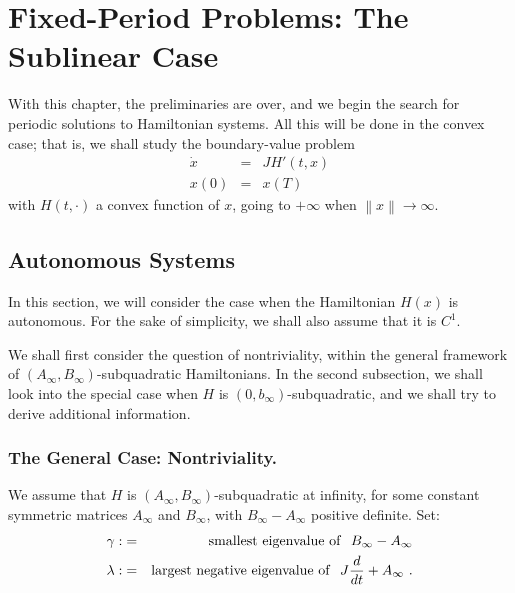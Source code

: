 \documentclass{svproc}
\begin{document}
    


\section{Fixed-Period Problems: The Sublinear Case}
%
With this chapter, the preliminaries are over, and we begin the search
for periodic solutions to Hamiltonian systems. All this will be done in
the convex case; that is, we shall study the boundary-value problem
\begin{eqnarray*}
  \dot{x}&=&JH' (t,x)\\
  x(0) &=& x(T)
\end{eqnarray*}
with $H(t,\cdot)$ a convex function of $x$, going to $+\infty$ when
$\left\|x\right\| \to \infty$.

%
\subsection{Autonomous Systems}
%
In this section, we will consider the case when the Hamiltonian $H(x)$
is autonomous. For the sake of simplicity, we shall also assume that it
is $C^{1}$.

We shall first consider the question of nontriviality, within the
general framework of
$\left(A_{\infty},B_{\infty}\right)$-subquadratic Hamiltonians. In
the second subsection, we shall look into the special case when $H$ is
$\left(0,b_{\infty}\right)$-subquadratic,
and we shall try to derive additional information.
%
\subsubsection{The General Case: Nontriviality.}
%
We assume that $H$ is
$\left(A_{\infty},B_{\infty}\right)$-sub\-qua\-dra\-tic at infinity,
for some constant symmetric matrices $A_{\infty}$ and $B_{\infty}$,
with $B_{\infty}-A_{\infty}$ positive definite. Set:
\begin{eqnarray}
\gamma :&=&{\rm smallest\ eigenvalue\ of}\ \ B_{\infty} - A_{\infty} \\
  \lambda : &=& {\rm largest\ negative\ eigenvalue\ of}\ \
  J \frac{d}{dt} +A_{\infty}\ .
\end{eqnarray}
\end{document}
